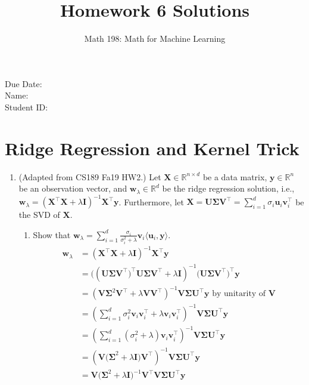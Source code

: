 \documentclass{article}
\title{Homework 6 Solutions}
\author{Math 198: Math for Machine Learning}
\date{}
\begin{document}
\maketitle

\noindent
Due Date:  \\
Name: \\
Student ID:

\section{Ridge Regression and Kernel Trick}
\begin{enumerate}[label=\arabic*.]
\item (Adapted from CS189 Fa19 HW2.) Let $\mathbf{X} \in \mathbb{R}^{n \times d}$ be a data matrix, $\mathbf{y} \in \mathbb{R}^n$ be an observation vector, and $\mathbf{w}_\lambda \in \mathbb{R}^d$ be the ridge regression solution, i.e., $\mathbf{w}_\lambda = (\mathbf{X^{\top}X} + \lambda\mathbf{I})^{-1}\mathbf{X^{\top}y}$. Furthermore, let $\mathbf{X} = \mathbf{U\Sigma V^{\top}} = \sum\limits_{i = 1}^d \sigma_i\mathbf{u}_i\mathbf{v}_i^{\top}$ be the SVD of $\mathbf{X}$.
		\begin{enumerate}
		\item Show that $\mathbf{w}_\lambda = \sum\limits_{i=1}^d \frac{\sigma_i}{\sigma_i^2 + \lambda} \mathbf{v}_i\langle \mathbf{u}_i, \mathbf{y} \rangle$. \\
		{\color{blue} \begin{align*}
		\mathbf{w}_\lambda &= (\mathbf{X^{\top}X} + \lambda\mathbf{I})^{-1}\mathbf{X^{\top}y} \\
		&= ((\mathbf{U\Sigma V^{\top})^{\top}U\Sigma V^{\top} +} \lambda\mathbf{I})^{-1}(\mathbf{U\Sigma V^{\top})^{\top}y} \\
		&= (\mathbf{V\Sigma}^2\mathbf{V^{\top} +} \lambda\mathbf{VV^{\top}})^{-1}\mathbf{V\Sigma U^{\top}y} \text{ by unitarity of } \mathbf{V} \\
		&= (\sum\limits_{i = 1}^d \sigma_i^2 \mathbf{v}_i\mathbf{v}_i^{\top} + \lambda\mathbf{v}_i\mathbf{v}_i^{\top})^{-1}\mathbf{V\Sigma U^{\top}y}  \\
		&= (\sum\limits_{i = 1}^d (\sigma_i^2 + \lambda)\mathbf{v}_i\mathbf{v}_i^{\top})^{-1}\mathbf{V\Sigma U^{\top}y} \\
		&= (\mathbf{V(\Sigma}^2 + \lambda\mathbf{I)V^{\top}})^{-1}\mathbf{V\Sigma U^{\top}y} \\
		&= \mathbf{V(\Sigma}^2 + \lambda\mathbf{I})^{-1}\mathbf{V^{\top}V\Sigma U^{\top}y} \\

\end{align*}}
\end{enumerate}
\end{enumerate}
\end{document}
